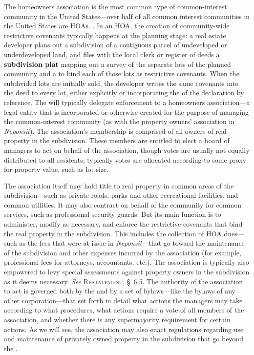 

The homeowners association is the most common type of common-interest community
in the United States---over half of all common interest communities in the
United States are HOAs. .
In an HOA, the creation of community-wide
restrictive covenants typically happens at the planning stage: a real estate
developer plans out a subdivision of a contiguous parcel of undeveloped or
underdeveloped land, and files with the local clerk or register of deeds a
\textbf{subdivision plat} mapping out a survey of the separate lots of the
planned community and a \textbf{} to bind each of those lots as
restrictive
covenants. When the subdivided lots are initially sold, the developer writes the
same covenants into the deed to every lot, either explicitly or incorporating
the  of the declaration by reference. The  will
typically delegate enforcement to a homeowners association---a legal entity that
is incorporated or otherwise created for the purpose of managing the
common-interest community (as with the property owners' association in
\textit{Neponsit}). The association's membership is comprised of all owners of
real property in the subdivision. These members are entitled to elect a board of
managers to act on behalf of the association, though votes are usually not
equally distributed to all residents; typically votes are allocated according to
some proxy for property value, such as lot size.

The association itself may hold title to real property in common areas of the
subdivision---such as private roads, parks and other recreational facilities,
and common utilities. It may also contract on behalf of the community for common
services, such as professional security guards. But its main function is to
administer, modify as necessary, and enforce the restrictive covenants that bind
the real property in the subdivision. This includes the collection of HOA
dues---such as the fees that were at issue in \textit{Neponsit}---that go toward
the maintenance of the subdivision and other expenses incurred by the
association (for example, professional fees for attorneys, accountants, etc.).
The association is typically also empowered to levy special assessments against
property owners in the subdivision as it deems necessary. \textit{See}
\textsc{Restatement}, \S~6.5. The authority of the association to act is
governed both by the  and by a set of bylaws---like the bylaws of
any other corporation---that set forth in detail what actions the managers may
take according to what procedures, what actions require a vote of all members of
the association, and whether there is any supermajority requirement for certain
actions. As we will see, the association may also enact regulations regarding
use and maintenance of privately owned property in the subdivision that go
beyond the .

